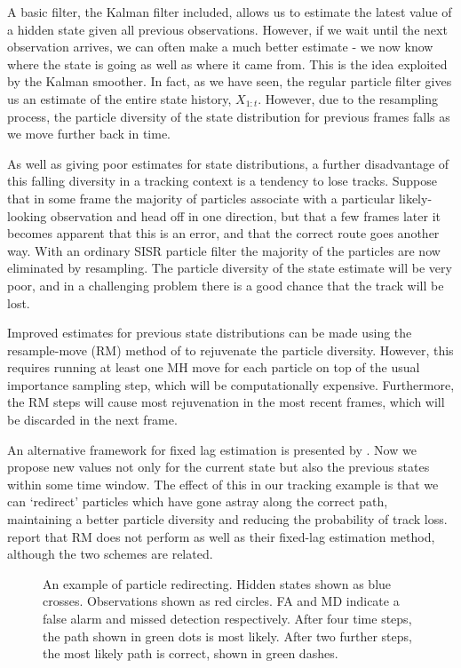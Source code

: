 A basic filter, the Kalman filter included, allows us to estimate the latest value of a hidden state given all previous observations. However, if we wait until the next observation arrives, we can often make a much better estimate - we now know where the state is going as well as where it came from. This is the idea exploited by the Kalman smoother. In fact, as we have seen, the regular particle filter gives us an estimate of the entire state history, $X_{1:t}$. However, due to the resampling process, the particle diversity of the state distribution for previous frames falls as we move further back in time.

As well as giving poor estimates for state distributions, a further disadvantage of this falling diversity in a tracking context is a tendency to lose tracks. Suppose that in some frame the majority of particles associate with a particular likely-looking observation and head off in one direction, but that a few frames later it becomes apparent that this is an error, and that the correct route goes another way. With an ordinary SISR particle filter the majority of the particles are now eliminated by resampling. The particle diversity of the state estimate will be very poor, and in a challenging problem there is a good chance that the track will be lost.

Improved estimates for previous state distributions can be made using the resample-move (RM) method of \cite{Gilks2001} to rejuvenate the particle diversity. However, this requires running at least one MH move for each particle on top of the usual importance sampling step, which will be computationally expensive. Furthermore, the RM steps will cause most rejuvenation in the most recent frames, which will be discarded in the next frame.

An alternative framework for fixed lag estimation is presented by \cite{Doucet2006}. Now we propose new values not only for the current state but also the previous states within some time window. The effect of this in our tracking example is that we can `redirect' particles which have gone astray along the correct path, maintaining a better particle diversity and reducing the probability of track loss. \cite{Doucet2006} report that RM does not perform as well as their fixed-lag estimation method, although the two schemes are related.

\begin{figure} \centering
%
\caption{An example of particle redirecting. Hidden states shown as blue crosses. Observations shown as red circles. FA and MD indicate a false alarm and missed detection respectively. After four time steps, the path shown in green dots is most likely. After two further steps, the most likely path is correct, shown in green dashes.}
\label{fig:BasicTrackingAssoc}%
\end{figure}